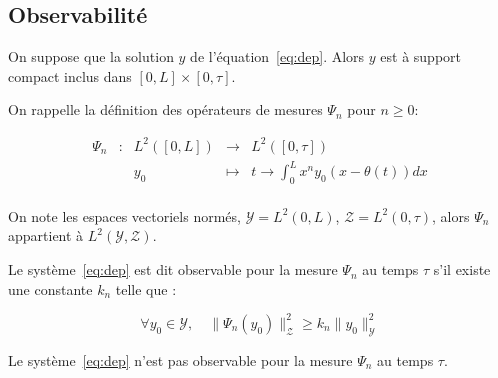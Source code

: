 \documentclass[a4paper]{article}
\begin{document}
\subsection{Observabilité}


On suppose que la solution $y$ de l'équation~\eqref{eq:dep}.
Alors $y$ est à support compact inclus dans $[0,L] \times [0,\tau]$. 

On rappelle la définition des opérateurs de mesures $\Psi_n$ pour $n \geq 0$:

 \begin{equation}
	\begin{array}{ccccc}
	\Psi_n & : & L^2([0,L]) & \to & L^2([0,\tau]) \\
	 & & y_0 & \mapsto & t \to \int_0^L x^n y_0(x-\theta(t)) dx\\
	\end{array}
\end{equation}

On note les espaces vectoriels normés,
 $\mathscr{Y} = L^2 (0,L)$,
 $\mathscr{Z} = L^2 (0,\tau)$,
alors $\Psi_n$ appartient à $L^2(\mathscr{Y},\mathscr{Z})$. 

\begin{definition}
Le système~\eqref{eq:dep} est dit observable pour la mesure $\Psi_n$ 
au temps $\tau$ s'il existe une constante $k_n$ telle que :

\begin{equation}
	\label{obs}
	\forall y_0 \in \mathscr{Y}, \quad \| \Psi_n(y_0)\|_{\mathscr{Z}}^2 \geq k_n \|y_0\|^2_{\mathscr{Y}}
\end{equation}

\end{definition}

\begin{proposition}
	Le système~\eqref{eq:dep} n'est pas observable pour la mesure $\Psi_n$ 
	au temps $\tau$.
\end{proposition}
\end{document}
